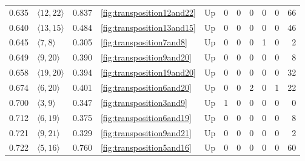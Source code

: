 \documentclass{article}
\begin{document}
\begin{center}
\begin{tabular}{lllllrrrrrr}
\cline{1-11} \cline{2-11} \cline{3-11} \cline{4-11}
0.635 & $\langle12, 22\rangle$ & 0.837 & \ref{fig:transposition12and22} & Up & 0 & 0 & 0 & 0 & 0 & 66 \\
\cline{1-11} \cline{2-11} \cline{3-11} \cline{4-11}
0.640 & $\langle13, 15\rangle$ & 0.484 & \ref{fig:transposition13and15} & Up & 0 & 0 & 0 & 0 & 0 & 46 \\
\cline{1-11} \cline{2-11} \cline{3-11} \cline{4-11}
0.645 & $\langle7, 8\rangle$ & 0.305 & \ref{fig:transposition7and8} & Up & 0 & 0 & 0 & 1 & 0 & 2 \\
\cline{1-11} \cline{2-11} \cline{3-11} \cline{4-11}
0.649 & $\langle9, 20\rangle$ & 0.390 & \ref{fig:transposition9and20} & Up & 0 & 0 & 0 & 0 & 0 & 8 \\
\cline{1-11} \cline{2-11} \cline{3-11} \cline{4-11}
0.658 & $\langle19, 20\rangle$ & 0.394 & \ref{fig:transposition19and20} & Up & 0 & 0 & 0 & 0 & 0 & 32 \\
\cline{1-11} \cline{2-11} \cline{3-11} \cline{4-11}
0.674 & $\langle6, 20\rangle$ & 0.401 & \ref{fig:transposition6and20} & Up & 0 & 0 & 2 & 0 & 1 & 22 \\
\cline{1-11} \cline{2-11} \cline{3-11} \cline{4-11}
0.700 & $\langle3, 9\rangle$ & 0.347 & \ref{fig:transposition3and9} & Up & 1 & 0 & 0 & 0 & 0 & 0 \\
\cline{1-11} \cline{2-11} \cline{3-11} \cline{4-11}
0.712 & $\langle6, 19\rangle$ & 0.375 & \ref{fig:transposition6and19} & Up & 0 & 0 & 0 & 0 & 0 & 8 \\
\cline{1-11} \cline{2-11} \cline{3-11} \cline{4-11}
0.721 & $\langle9, 21\rangle$ & 0.329 & \ref{fig:transposition9and21} & Up & 0 & 0 & 0 & 0 & 0 & 2 \\
\cline{1-11} \cline{2-11} \cline{3-11} \cline{4-11}
0.722 & $\langle5, 16\rangle$ & 0.760 & \ref{fig:transposition5and16} & Up & 0 & 0 & 0 & 0 & 0 & 60 \\
\cline{1-11} \cline{2-11} \cline{3-11} \cline{4-11}
\bottomrule
\end{tabular}


\end{center}
\end{document}
